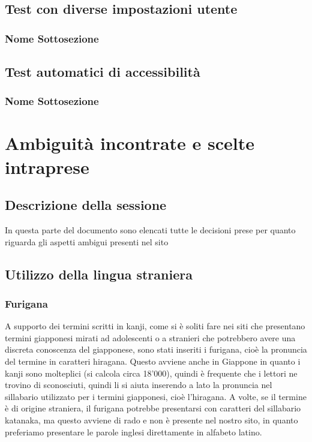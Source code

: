 \documentclass[openany, a4paper, 12pt]{report}
\begin{document}
		\section{Test con diverse impostazioni utente}
			\subsection{Nome Sottosezione}
		\section{Test automatici di accessibilità}
			\subsection{Nome Sottosezione}
	
	\chapter{Ambiguità incontrate e scelte intraprese}
		\section{Descrizione della sessione}
			In questa parte del documento sono elencati tutte le decisioni prese per quanto riguarda gli aspetti ambigui presenti nel sito\\
		\section{Utilizzo della lingua straniera}
			\subsection{Furigana}
				A supporto dei termini scritti in kanji, come si è soliti fare nei siti che presentano termini giapponesi mirati ad adolescenti o a stranieri che potrebbero avere una discreta conoscenza del giapponese, sono stati inseriti i furigana, cioè la pronuncia del termine in caratteri hiragana.
				Questo avviene anche in Giappone in quanto i kanji sono molteplici (si calcola circa 18'000), quindi è frequente che i lettori ne trovino di sconosciuti, quindi li si aiuta inserendo a lato la pronuncia nel sillabario utilizzato per i termini giapponesi, cioè l'hiragana.
				A volte, se il termine è di origine straniera, il furigana potrebbe presentarsi con caratteri del sillabario katanaka, ma questo avviene di rado e non è presente nel nostro sito, in quanto preferiamo presentare le parole inglesi direttamente in alfabeto latino. 
\end{document}
